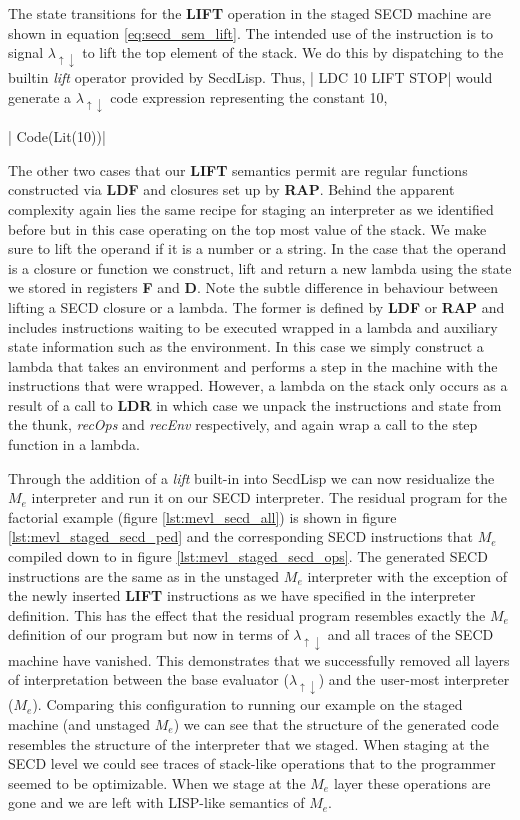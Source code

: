 \documentclass[a4paper,12pt,twoside,openright]{report}
\theoremstyle{definition}
\newcommand{\mslang}{$\lambda_{\uparrow\downarrow}$}
\newcommand{\mevl}{$M_{e}$}
\newcommand{\secdlisp}{SecdLisp}
\begin{document}
The state transitions for the \textbf{LIFT} operation in the staged SECD machine are shown in equation \ref{eq:secd_sem_lift}. The intended use of the instruction is to signal \mslang{} to lift the top element of the stack. We do this by dispatching to the builtin \textit{lift} operator provided by \secdlisp. Thus, |   LDC 10 LIFT STOP| would generate a \mslang{} code expression representing the constant 10,

|    Code(Lit(10))|

The other two cases that our \textbf{LIFT} semantics permit are regular functions constructed via \textbf{LDF} and closures set up by \textbf{RAP}. Behind the apparent complexity again lies the same recipe for staging an interpreter as we identified before but in this case operating on the top most value of the stack. We make sure to lift the operand if it is a number or a string. In the case that the operand is a closure or function we construct, lift and return a new lambda using the state we stored in registers \textbf{F} and \textbf{D}. Note the subtle difference in behaviour between lifting a SECD closure or a lambda. The former is defined by \textbf{LDF} or \textbf{RAP} and includes instructions waiting to be executed wrapped in a lambda and auxiliary state information such as the environment. In this case we simply construct a lambda that takes an environment and performs a step in the machine with the instructions that were wrapped. However, a lambda on the stack only occurs as a result of a call to \textbf{LDR} in which case we unpack the instructions and state from the thunk, \textit{recOps} and \textit{recEnv} respectively, and again wrap a call to the step function in a lambda.

Through the addition of a \textit{lift} built-in into \secdlisp{} we can now residualize the \mevl{} interpreter and run it on our SECD interpreter. The residual program for the factorial example (figure \ref{lst:mevl_secd_all}) is shown in figure \ref{lst:mevl_staged_secd_ped} and the corresponding SECD instructions that \mevl{} compiled down to in figure \ref{lst:mevl_staged_secd_ops}. The generated SECD instructions are the same as in the unstaged \mevl{} interpreter with the exception of the newly inserted \textbf{LIFT} instructions as we have specified in the interpreter definition. This has the effect that the residual program resembles exactly the \mevl{} definition of our program but now in terms of \mslang{} and all traces of the SECD machine have vanished. This demonstrates that we successfully removed all layers of interpretation between the base evaluator (\mslang{}) and the user-most interpreter (\mevl{}). Comparing this configuration to running our example on the staged machine (and unstaged \mevl{}) we can see that the structure of the generated code resembles the structure of the interpreter that we staged. When staging at the SECD level we could see traces of stack-like operations that to the programmer seemed to be optimizable. When we stage at the \mevl{} layer these operations are gone and we are left with LISP-like semantics of \mevl{}.
\end{document}
